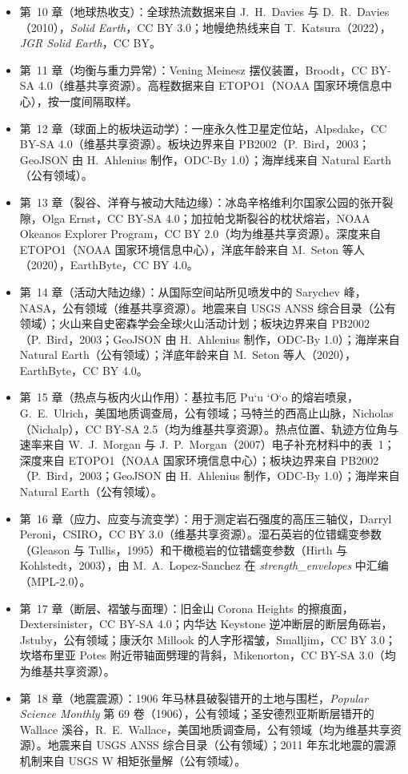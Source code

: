 \begin{itemize}
  \item 第~10 章（地球热收支）：全球热流数据来自 J.~H.~Davies 与 D.~R.~Davies（2010），\emph{Solid Earth}，CC BY 3.0；地幔绝热线来自 T.~Katsura（2022），\emph{JGR Solid Earth}，CC BY。
  \item 第~11 章（均衡与重力异常）：Vening Meinesz 摆仪装置，Broodt，CC BY-SA 4.0（维基共享资源）。高程数据来自 ETOPO1（NOAA 国家环境信息中心），按一度间隔取样。
  \item 第~12 章（球面上的板块运动学）：一座永久性卫星定位站，Alpsdake，CC BY-SA 4.0（维基共享资源）。板块边界来自 PB2002（P.~Bird，2003；GeoJSON 由 H.~Ahlenius 制作，ODC-By 1.0）；海岸线来自 Natural Earth（公有领域）。
  \item 第~13 章（裂谷、洋脊与被动大陆边缘）：冰岛辛格维利尔国家公园的张开裂隙，Olga Ernst，CC BY-SA 4.0；加拉帕戈斯裂谷的枕状熔岩，NOAA Okeanos Explorer Program，CC BY 2.0（均为维基共享资源）。深度来自 ETOPO1（NOAA 国家环境信息中心），洋底年龄来自 M.~Seton 等人（2020），EarthByte，CC BY 4.0。
  \item 第~14 章（活动大陆边缘）：从国际空间站所见喷发中的 Sarychev 峰，NASA，公有领域（维基共享资源）。地震来自 USGS ANSS 综合目录（公有领域）；火山来自史密森学会全球火山活动计划；板块边界来自 PB2002（P.~Bird，2003；GeoJSON 由 H.~Ahlenius 制作，ODC-By 1.0）；海岸来自 Natural Earth（公有领域）；洋底年龄来自 M.~Seton 等人（2020），EarthByte，CC BY 4.0。
  \item 第~15 章（热点与板内火山作用）：基拉韦厄 Pu\textquoteleft u \textquoteleft O\textquoteleft o 的熔岩喷泉，G.~E.~Ulrich，美国地质调查局，公有领域；马特兰的西高止山脉，Nicholas（Nichalp），CC BY-SA 2.5（均为维基共享资源）。热点位置、轨迹方位角与速率来自 W.~J.~Morgan 与 J.~P.~Morgan（2007）电子补充材料中的表~1；深度来自 ETOPO1（NOAA 国家环境信息中心）；板块边界来自 PB2002（P.~Bird，2003；GeoJSON 由 H.~Ahlenius 制作，ODC-By 1.0）；海岸来自 Natural Earth（公有领域）。
  \item 第~16 章（应力、应变与流变学）：用于测定岩石强度的高压三轴仪，Darryl Peroni，CSIRO，CC BY 3.0（维基共享资源）。湿石英岩的位错蠕变参数（Gleason 与 Tullis，1995）和干橄榄岩的位错蠕变参数（Hirth 与 Kohlstedt，2003），由 M.~A.~Lopez-Sanchez 在 \emph{strength\_envelopes} 中汇编（MPL-2.0）。
  \item 第~17 章（断层、褶皱与面理）：旧金山 Corona Heights 的擦痕面，Dextersinister，CC BY-SA 4.0；内华达 Keystone 逆冲断层的断层角砾岩，Jstuby，公有领域；康沃尔 Millook 的人字形褶皱，Smalljim，CC BY 3.0；坎塔布里亚 Potes 附近带轴面劈理的背斜，Mikenorton，CC BY-SA 3.0（均为维基共享资源）。
  \item 第~18 章（地震震源）：1906 年马林县破裂错开的土地与围栏，\emph{Popular Science Monthly} 第 69 卷（1906），公有领域；圣安德烈亚斯断层错开的 Wallace 溪谷，R.~E.~Wallace，美国地质调查局，公有领域（均为维基共享资源）。地震来自 USGS ANSS 综合目录（公有领域）；2011 年东北地震的震源机制来自 USGS W 相矩张量解（公有领域）。

\end{itemize}
